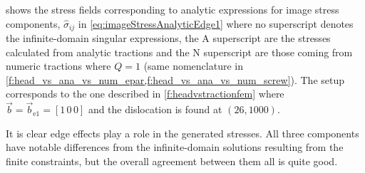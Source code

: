  shows the stress fields corresponding to analytic expressions for image stress components, $\hat{\sigma}_{ij}$ in \cref{eq:imageStressAnalyticEdge1} where no superscript denotes the infinite-domain singular expressions, the $\textrm{A}$ superscript are the stresses calculated from analytic tractions and the $\textrm{N}$ superscript are those coming from numeric tractions where $Q = 1$ (same nomenclature in \cref{f:head_vs_ana_vs_num_epar,f:head_vs_ana_vs_num_screw}). The setup corresponds to the one described in \cref{f:headvstractionfem} where $\vec{b} = \vec{b}_{\textrm{e1}} = [1\, 0\, 0]$ and the dislocation is found at $(26, 1000)$.

It is clear edge effects play a role in the generated stresses. All three components have notable differences from the infinite-domain solutions resulting from the finite constraints, but the overall agreement between them all is quite good.

